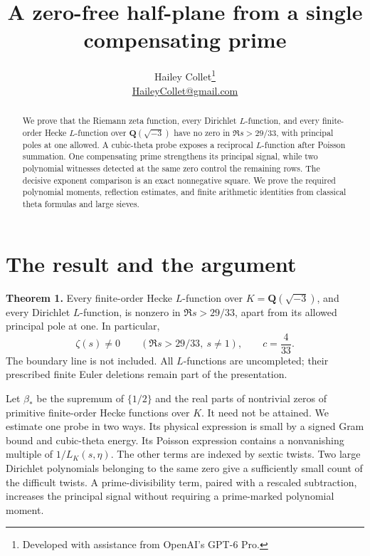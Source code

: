\documentclass[11pt,a4paper]{article}
\title{\vspace{-1.3em}A zero-free half-plane from a single compensating prime}
\author{Hailey Collet\thanks{Developed with assistance from OpenAI's GPT-6 Pro.}\\
\small\href{mailto:HaileyCollet@gmail.com}{HaileyCollet@gmail.com}}
\date{}
\begin{document}
\maketitle
\vspace{-2.0em}
\begin{abstract}
We prove that the Riemann zeta function, every Dirichlet \(L\)-function, and every finite-order Hecke \(L\)-function over \(\mathbf Q(\sqrt{-3})\) have no zero in \(\Re s>29/33\), with principal poles at one allowed. A cubic-theta probe exposes a reciprocal \(L\)-function after Poisson summation. One compensating prime strengthens its principal signal, while two polynomial witnesses detected at the same zero control the remaining rows. The decisive exponent comparison is an exact nonnegative square. We prove the required polynomial moments, reflection estimates, and finite arithmetic identities from classical theta formulas and large sieves.

\end{abstract}

\section{The result and the argument}\label{sec:1}

\textbf{Theorem 1.} Every finite-order Hecke \(L\)-function over \(K=\mathbf Q(\sqrt{-3})\), and every Dirichlet \(L\)-function, is nonzero in \(\Re s>29/33\), apart from its allowed principal pole at one. In particular, \[
\boxed{\zeta(s)\ne0\qquad(\Re s>29/33,\ s\ne1),\qquad c=\frac4{33}.}
\] The boundary line is not included. All \(L\)-functions are uncompleted; their prescribed finite Euler deletions remain part of the presentation.

Let \(\beta_*\) be the supremum of \(\{1/2\}\) and the real parts of nontrivial zeros of primitive finite-order Hecke functions over \(K\). It need not be attained. We estimate one probe in two ways. Its physical expression is small by a signed Gram bound and cubic-theta energy. Its Poisson expression contains a nonvanishing multiple of \(1/L_K(s,\eta)\). The other terms are indexed by sextic twists. Two large Dirichlet polynomials belonging to the same zero give a sufficiently small count of the difficult twists. A prime-divisibility term, paired with a rescaled subtraction, increases the principal signal without requiring a prime-marked polynomial moment.
\end{document}
